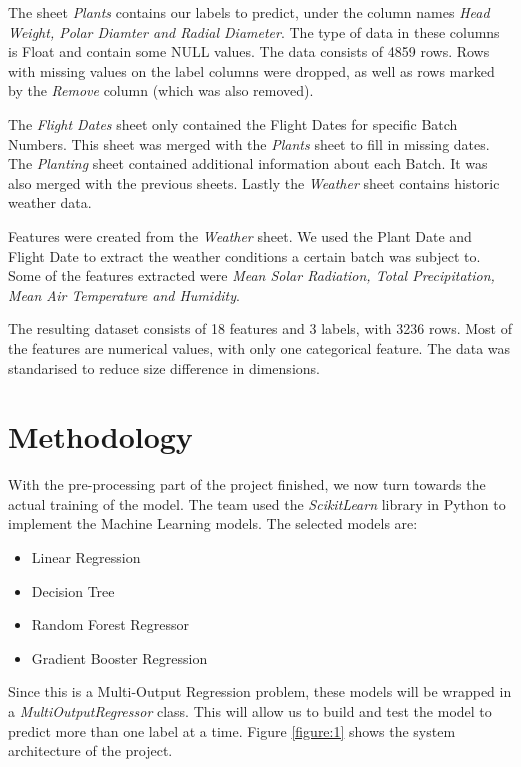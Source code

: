 \documentclass{article}
\begin{document}
The sheet \emph{Plants} contains our labels to predict, under the column names
\emph{Head Weight, Polar Diamter and Radial Diameter}. The type of data in these
columns is Float and contain some NULL values. The data consists of 4859 rows. Rows with
missing values on the label columns were dropped, as well as rows marked by the \emph{Remove}
column (which was also removed).

The \emph{Flight Dates} sheet only contained the Flight Dates for specific Batch Numbers.
This sheet was merged with the \emph{Plants} sheet to fill in missing dates. The \emph{Planting}
sheet contained additional information about each Batch. It was also merged with the previous
sheets. Lastly the \emph{Weather} sheet contains historic weather data.

Features were created from the \emph{Weather} sheet. We used the Plant Date and Flight
Date to extract the weather conditions a certain batch was subject to. Some of the features
extracted were \emph{Mean Solar Radiation, Total Precipitation, Mean Air Temperature and
Humidity}.

The resulting dataset consists of 18 features and 3 labels, with 3236 rows. Most of the features
are numerical values, with only one categorical feature. The data was standarised to reduce
size difference in dimensions.

\section{Methodology}

With the pre-processing part of the project finished, we now turn towards the actual
training of the model. The team used the \emph{ScikitLearn} library in Python to implement
the Machine Learning models. The selected models are:

\begin{itemize}
    \item Linear Regression
    \item Decision Tree
    \item Random Forest Regressor
    \item Gradient Booster Regression
\end{itemize}

Since this is a Multi-Output Regression problem, these models will be wrapped in a
\emph{MultiOutputRegressor} class. This will allow us to build and test the model to
predict more than one label at a time. Figure \ref{figure:1} shows the system architecture
of the project.
\end{document}
